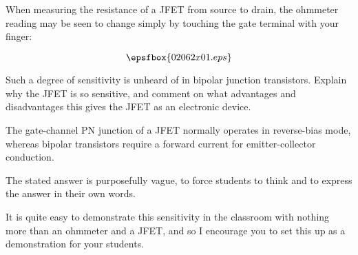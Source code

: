 

When measuring the resistance of a JFET from source to drain, the ohmmeter reading may be seen to change simply by touching the gate terminal with your finger:

$$\epsfbox{02062x01.eps}$$

Such a degree of sensitivity is unheard of in bipolar junction transistors.  Explain why the JFET is so sensitive, and comment on what advantages and disadvantages this gives the JFET as an electronic device.







The gate-channel PN junction of a JFET normally operates in reverse-bias mode, whereas bipolar transistors require a forward current for emitter-collector conduction.







The stated answer is purposefully vague, to force students to think and to express the answer in their own words.  

It is quite easy to demonstrate this sensitivity in the classroom with nothing more than an ohmmeter and a JFET, and so I encourage you to set this up as a demonstration for your students.




